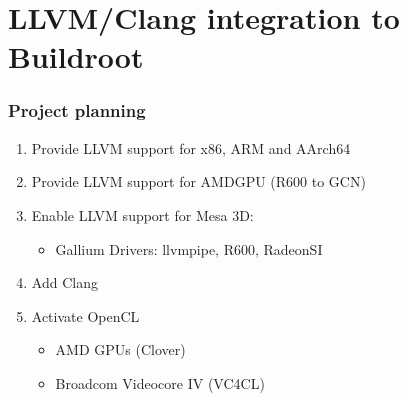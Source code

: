 \documentclass{smilebeamer}
\begin{document}
\section{LLVM/Clang integration to Buildroot}

\begin{frame}
\frametitle{Project planning}
\begin{enumerate}
  \item Provide LLVM support for x86, ARM and AArch64
  \item Provide LLVM support for AMDGPU (R600 to GCN)
  \item Enable LLVM support for Mesa 3D:
    \begin{itemize}
      \item Gallium Drivers: llvmpipe, R600, RadeonSI
    \end{itemize}
  \item Add Clang
  \item Activate OpenCL
  \begin{itemize}
    \item AMD GPUs (Clover)
    \item Broadcom Videocore IV (VC4CL)
  \end{itemize}
\end{enumerate}
\end{frame}
\end{document}
